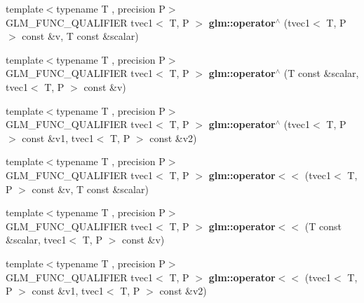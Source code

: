 \begin{DoxyCompactItemize}
\item 
\hypertarget{namespaceglm_a0b6d7445e57ebc5e64ea7a1999f0e1a2}{{\footnotesize template$<$typename T , precision P$>$ }\\G\-L\-M\-\_\-\-F\-U\-N\-C\-\_\-\-Q\-U\-A\-L\-I\-F\-I\-E\-R tvec1$<$ T, P $>$ {\bfseries glm\-::operator$^\wedge$} (tvec1$<$ T, P $>$ const \&v, T const \&scalar)}\label{namespaceglm_a0b6d7445e57ebc5e64ea7a1999f0e1a2}

\item 
\hypertarget{namespaceglm_ae8b0f470941048d25385e1caa91e2475}{{\footnotesize template$<$typename T , precision P$>$ }\\G\-L\-M\-\_\-\-F\-U\-N\-C\-\_\-\-Q\-U\-A\-L\-I\-F\-I\-E\-R tvec1$<$ T, P $>$ {\bfseries glm\-::operator$^\wedge$} (T const \&scalar, tvec1$<$ T, P $>$ const \&v)}\label{namespaceglm_ae8b0f470941048d25385e1caa91e2475}

\item 
\hypertarget{namespaceglm_ab1bd800c3747bf636e32a27e1200b811}{{\footnotesize template$<$typename T , precision P$>$ }\\G\-L\-M\-\_\-\-F\-U\-N\-C\-\_\-\-Q\-U\-A\-L\-I\-F\-I\-E\-R tvec1$<$ T, P $>$ {\bfseries glm\-::operator$^\wedge$} (tvec1$<$ T, P $>$ const \&v1, tvec1$<$ T, P $>$ const \&v2)}\label{namespaceglm_ab1bd800c3747bf636e32a27e1200b811}

\item 
\hypertarget{namespaceglm_a86c825110b3847a79fb9035274e74d87}{{\footnotesize template$<$typename T , precision P$>$ }\\G\-L\-M\-\_\-\-F\-U\-N\-C\-\_\-\-Q\-U\-A\-L\-I\-F\-I\-E\-R tvec1$<$ T, P $>$ {\bfseries glm\-::operator$<$$<$} (tvec1$<$ T, P $>$ const \&v, T const \&scalar)}\label{namespaceglm_a86c825110b3847a79fb9035274e74d87}

\item 
\hypertarget{namespaceglm_a9a04b9b7a6dfee919de55036fdfd8343}{{\footnotesize template$<$typename T , precision P$>$ }\\G\-L\-M\-\_\-\-F\-U\-N\-C\-\_\-\-Q\-U\-A\-L\-I\-F\-I\-E\-R tvec1$<$ T, P $>$ {\bfseries glm\-::operator$<$$<$} (T const \&scalar, tvec1$<$ T, P $>$ const \&v)}\label{namespaceglm_a9a04b9b7a6dfee919de55036fdfd8343}

\item 
\hypertarget{namespaceglm_a18bc5532629133c9f2073b928778cc5c}{{\footnotesize template$<$typename T , precision P$>$ }\\G\-L\-M\-\_\-\-F\-U\-N\-C\-\_\-\-Q\-U\-A\-L\-I\-F\-I\-E\-R tvec1$<$ T, P $>$ {\bfseries glm\-::operator$<$$<$} (tvec1$<$ T, P $>$ const \&v1, tvec1$<$ T, P $>$ const \&v2)}\label{namespaceglm_a18bc5532629133c9f2073b928778cc5c}


\end{DoxyCompactItemize}
